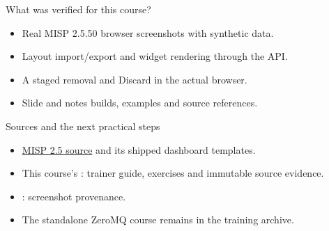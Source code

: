 \begin{frame}{What was verified for this course?}
    \begin{itemize}
        \item Real MISP 2.5.50 browser screenshots with synthetic data.
        \item Layout import/export and widget rendering through the API.
        \item A staged removal and Discard in the actual browser.
        \item Slide and notes builds, examples and source references.
    \end{itemize}
\end{frame}

\begin{frame}{Sources and the next practical steps}
    \begin{itemize}
        \item \href{https://github.com/MISP/MISP/tree/2.5}{MISP 2.5 source}
        and its shipped dashboard templates.
        \item This course's : trainer guide, exercises and
        immutable source evidence.
        \item {}: screenshot provenance.
        \item The standalone ZeroMQ course remains in the training archive.
    \end{itemize}
\end{frame}
